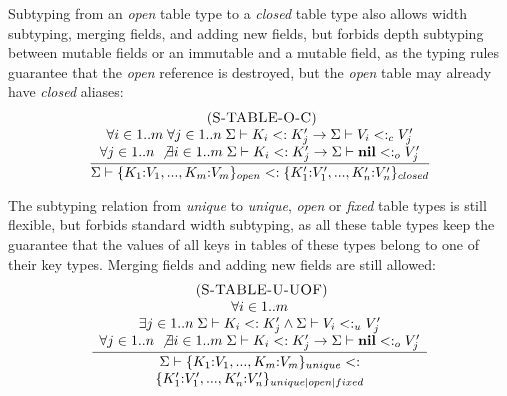 \documentclass{sigplanconf}
\newcommand{\Nil}{\mathbf{nil}}
\newcommand{\mylabel}[1]{\; (\textsc{#1})}
\newcommand{\senv}{\Sigma}
\newcommand{\subtype}{<:}
\begin{document}
Subtyping from an {\em open} table type to a {\em closed}
table type also allows width subtyping, merging fields,
and adding new fields, but forbids depth subtyping between
mutable fields or an immutable and a mutable field, as
the typing rules guarantee that the {\em open} reference
is destroyed, but the {\em open} table may already have {\em closed} aliases:
\[
\begin{array}{c}
\mylabel{S-TABLE-O-C}\\
\dfrac{\begin{array}{c}
	\forall i \in 1..m \; \forall j \in 1..n \;
	\senv \vdash K_{i} \subtype K_{j}' \to \senv \vdash V_{i} \subtype_{c} V_{j}' \\
	\forall j \in 1..n \; \not\exists i \in 1..m \;
	\senv \vdash K_{i} \subtype K_{j}' \to \senv \vdash \Nil \subtype_{o} V_{j}'
	\end{array}}
{\senv \vdash \{K_{1}{:}V_{1}, ..., K_{m}{:}V_{m}\}_{open} \subtype
	\{K_{1}'{:}V_{1}', ..., K_{n}'{:}V_{n}'\}_{closed}}
\end{array}
\]

The subtyping relation from {\em unique} to {\em unique},
{\em open} or {\em fixed} table types is still flexible, but forbids standard width subtyping, as all these table types keep the guarantee that the values of all keys in tables of these types belong to one of their key types. Merging fields and adding new fields are still allowed:
\[
\begin{array}{c}
\mylabel{S-TABLE-U-UOF}\\
\dfrac{\begin{array}{c}
       \forall i \in 1..m \\
       \exists j \in 1..n \;
       \senv \vdash K_{i} \subtype K_{j}' \land \senv \vdash V_{i} \subtype_{u} V_{j}' \\
       \forall j \in 1..n \; \not\exists i \in 1..m \;
       \senv \vdash K_{i} \subtype K_{j}' \to \senv \vdash \Nil \subtype_{o} V_{j}'
       \end{array}}
      {\begin{array}{c}
       \senv \vdash \{K_{1}{:}V_{1}, ..., K_{m}{:}V_{m}\}_{unique} \subtype\\
                    \{K_{1}'{:}V_{1}', ..., K_{n}'{:}V_{n}'\}_{unique|open|fixed}
       \end{array}}
\end{array}
\]
\end{document}
